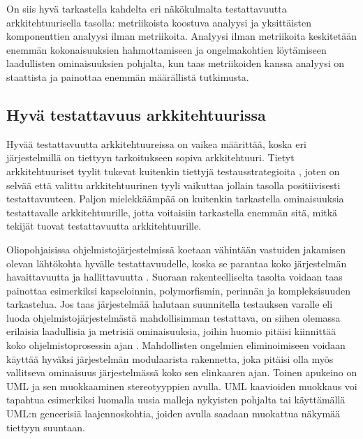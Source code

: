 \documentclass[finnish]{tktltiki2}
\numberwithin{table}{section}
\theoremstyle{definition}
\theoremstyle{remark}
\begin{document}
On siis hyvä tarkastella kahdelta eri näkökulmalta testattavuutta arkkitehtuurisella tasolla: metriikoista koostuva analyysi ja yksittäisten komponenttien analyysi ilman metriikoita. Analyysi ilman metriikoita keskitetään enemmän kokonaisuuksien hahmottamiseen ja ongelmakohtien löytämiseen laadullisten ominaisuuksien pohjalta, kun taas metriikoiden kanssa analyysi on staattista ja painottaa enemmän määrällistä tutkimusta.


\subsection{Hyvä testattavuus arkkitehtuurissa} \label{good_testability}

 
Hyvää testattavuutta arkkitehtuureissa on vaikea määrittää, koska eri järjestelmillä on tiettyyn tarkoitukseen sopiva arkkitehtuuri. Tietyt arkkitehtuuriset tyylit tukevat kuitenkin tiettyjä testausstrategioita \citep{Eickelmann:1996:MOS:243327.243602}, joten on selvää että valittu arkkitehtuurinen tyyli vaikuttaa jollain tasolla positiivisesti testattavuuteen. Paljon mielekkäämpää on kuitenkin tarkastella  ominaisuuksia testattavalle arkkitehtuurille, jotta voitaisiin tarkastella enemmän sitä, mitkä tekijät tuovat testattavuutta arkkitehtuurille.

Oliopohjaisissa ohjelmistojärjestelmissä koetaan vähintään vastuiden jakamisen olevan  lähtökohta hyvälle testattavuudelle, koska se parantaa koko järjestelmän havaittavuutta ja hallittavuutta \citep{Binder:1994:DTO:182987.184077}. Suoraan rakenteelliselta tasolta voidaan taas painottaa esimerkiksi kapseloinnin, polymorfismin, perinnän ja kompleksisuuden tarkastelua. Jos taas järjestelmää halutaan suunnitella testauksen varalle eli luoda ohjelmistojärjestelmästä mahdollisimman testattava, on siihen olemassa erilaisia laadullisia ja metrisiä ominaisuuksia, joihin huomio pitäisi kiinnittää koko ohjelmistoprosessin ajan \citep{joshi_design_2014}. Mahdollisten ongelmien eliminoimiseen voidaan käyttää hyväksi järjestelmän modulaarista rakennetta, joka pitäisi olla myös vallitseva ominaisuus järjestelmässä koko sen elinkaaren ajan. Toinen apukeino on UML ja sen  muokkaaminen stereotyyppien avulla. UML kaavioiden muokkaus voi tapahtua esimerkiksi luomalla uusia malleja nykyisten pohjalta tai käyttämällä UML:n geneerisiä laajennoskohtia, joiden avulla saadaan muokattua näkymää tiettyyn suuntaan.


\end{document}
